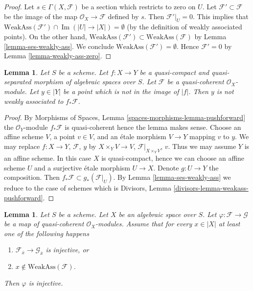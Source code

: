 \documentclass{stacks-project}
\theoremstyle{plain}
\newtheorem{lemma}[subsection]{Lemma}
\theoremstyle{definition}
\theoremstyle{remark}
\numberwithin{equation}{subsection}
\def\Im{\mathop{\mathrm{Im}}}
\begin{document}
\begin{proof}
Let $s \in \Gamma(X, \mathcal{F})$ be a section which restricts to zero on $U$.
Let $\mathcal{F}' \subset \mathcal{F}$ be the image of the map
$\mathcal{O}_X \to \mathcal{F}$ defined by $s$. Then $\mathcal{F}'|_U = 0$.
This implies that
$\text{WeakAss}(\mathcal{F}') \cap \Im(|U| \to |X|) = \emptyset$
(by the definition of weakly associated points).
On the other hand,
$\text{WeakAss}(\mathcal{F}') \subset \text{WeakAss}(\mathcal{F})$
by Lemma \ref{lemma-ses-weakly-ass}. We conclude
$\text{WeakAss}(\mathcal{F}') = \emptyset$.
Hence $\mathcal{F}' = 0$ by Lemma \ref{lemma-weakly-ass-zero}.
\end{proof}

\begin{lemma}
\label{lemma-weakass-pushforward}
Let $S$ be a scheme. Let $f : X \to Y$ be a quasi-compact and quasi-separated
morphism of algebraic spaces over $S$. Let $\mathcal{F}$ be a quasi-coherent
$\mathcal{O}_X$-module. Let $y \in |Y|$ be a point which is not in the
image of $|f|$. Then $y$ is not weakly associated to $f_*\mathcal{F}$.
\end{lemma}

\begin{proof}
By Morphisms of Spaces, Lemma \ref{spaces-morphisms-lemma-pushforward}
the $\mathcal{O}_Y$-module $f_*\mathcal{F}$ is quasi-coherent hence
the lemma makes sense.
Choose an affine scheme $V$, a point $v \in V$, and an \'etale morphism
$V \to Y$ mapping $v$ to $y$. We may replace
$f : X \to Y$, $\mathcal{F}$, $y$ by
$X \times_Y V \to V$, $\mathcal{F}|_{X \times_Y V}$, $v$.
Thus we may assume $Y$ is an affine scheme.
In this case $X$ is quasi-compact, hence we can choose
an affine scheme $U$ and a surjective \'etale morphism $U \to X$.
Denote $g : U \to Y$ the composition.
Then $f_*\mathcal{F} \subset g_*(\mathcal{F}|_U)$.
By Lemma \ref{lemma-ses-weakly-ass}
we reduce to the case of schemes which is
Divisors, Lemma \ref{divisors-lemma-weakass-pushforward}.
\end{proof}

\begin{lemma}
\label{lemma-check-injective-on-weakass}
Let $S$ be a scheme. Let $X$ be an algebraic space over $S$.
Let $\varphi : \mathcal{F} \to \mathcal{G}$ be a map of
quasi-coherent $\mathcal{O}_X$-modules. Assume that for every
$x \in |X|$ at least one of the following happens
\begin{enumerate}
\item $\mathcal{F}_{\overline{x}} \to \mathcal{G}_{\overline{x}}$
is injective, or
\item $x \not \in \text{WeakAss}(\mathcal{F})$.
\end{enumerate}
Then $\varphi$ is injective.
\end{lemma}
\end{document}
